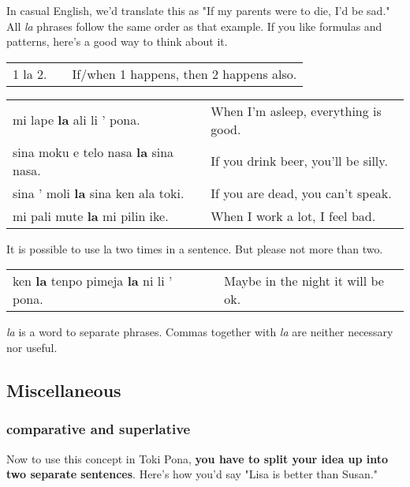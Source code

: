 In casual English, we'd translate this as "If my parents were to die, I'd be sad." 
All \textit{la} phrases follow the same order as that example. 
If you like formulas and patterns, here's a good way to think about it. 

\begin{supertabular}{p{5,5cm}|ll}
1 la 2. && If/when 1 happens, then 2 happens also. \\  %
\end{supertabular} 

\begin{supertabular}{p{5,5cm}|ll}
mi lape \textbf{la} ali li ' pona. && When I'm asleep, everything is good. \\
sina moku e telo nasa \textbf{la} sina nasa. && If you drink beer, you'll be silly. \\
sina ' moli \textbf{la} sina ken ala toki. && If you are dead, you can't speak. \\
mi pali mute \textbf{la} mi pilin ike. && When I work a lot, I feel bad. \\
\end{supertabular} 

It is possible to use la two times in a sentence. But please not more than two. 

\begin{supertabular}{p{5,5cm}|ll}
ken \textbf{la} tenpo pimeja \textbf{la} ni li ' pona. && Maybe in the night it will be ok. \\  
\end{supertabular} 

\textit{la} is a word to separate phrases. Commas together with \textit{la} are neither necessary nor useful. 
%
\subsection*{Miscellaneous}
\subsubsection*{comparative and superlative} 
%
Now to use this concept in Toki Pona, \textbf{you have to split your idea up into two separate sentences}. 
Here's how you'd say "Lisa is better than Susan."

